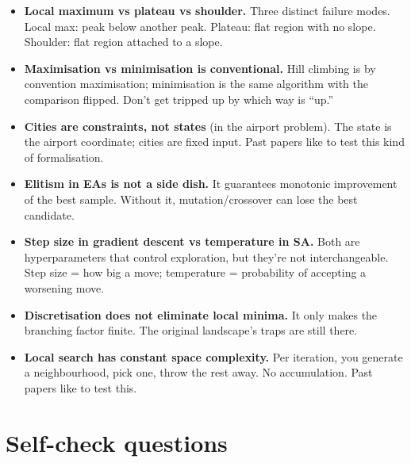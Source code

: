 \documentclass[11pt, a4paper]{article}
\begin{document}
\begin{itemize}
  \item \textbf{Local maximum vs plateau vs shoulder.} Three distinct failure modes. Local max: peak below another peak. Plateau: flat region with no slope. Shoulder: flat region attached to a slope.
  \item \textbf{Maximisation vs minimisation is conventional.} Hill climbing is by convention maximisation; minimisation is the same algorithm with the comparison flipped. Don't get tripped up by which way is ``up.''
  \item \textbf{Cities are constraints, not states} (in the airport problem). The state is the airport coordinate; cities are fixed input. Past papers like to test this kind of formalisation.
  \item \textbf{Elitism in EAs is not a side dish.} It guarantees monotonic improvement of the best sample. Without it, mutation/crossover can lose the best candidate.
  \item \textbf{Step size in gradient descent vs temperature in SA.} Both are hyperparameters that control exploration, but they're not interchangeable. Step size = how big a move; temperature = probability of accepting a worsening move.
  \item \textbf{Discretisation does not eliminate local minima.} It only makes the branching factor finite. The original landscape's traps are still there.
  \item \textbf{Local search has constant space complexity.} Per iteration, you generate a neighbourhood, pick one, throw the rest away. No accumulation. Past papers like to test this.
\end{itemize}

\section*{Self-check questions}
\end{document}
